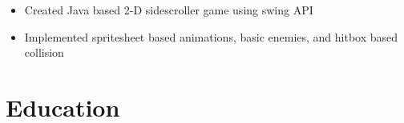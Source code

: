 \documentclass{simple_resume}
\begin{document}
\begin{itemize}
  \item{Created Java based 2-D sidescroller game using swing API}
  \item{Implemented spritesheet based animations, basic enemies, and hitbox based collision}
\end{itemize}

\section{Education}

\end{document}
